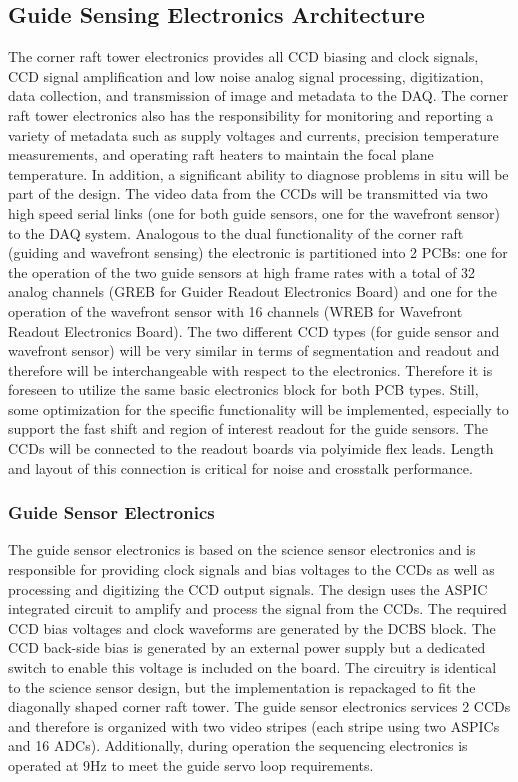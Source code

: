 \subsection{Guide Sensing Electronics Architecture}

The corner raft tower electronics provides all CCD biasing and clock signals, CCD signal amplification and
low noise analog signal processing, digitization, data collection, and transmission of image and metadata
to the DAQ. The corner raft tower electronics also has the responsibility for monitoring and reporting a
variety of metadata such as supply voltages and currents, precision temperature measurements, and
operating raft heaters to maintain the focal plane temperature. In addition, a significant ability to
diagnose problems in situ will be part of the design. The video data from the CCDs will be transmitted
via two high speed serial links (one for both guide sensors, one for the wavefront sensor) to the DAQ
system. Analogous to the dual functionality of the corner raft (guiding and wavefront sensing) the
electronic is partitioned into 2 PCBs: one for the operation of the two guide sensors at high frame rates
with a total of 32 analog channels (GREB for Guider Readout Electronics Board) and one for the
operation of the wavefront sensor with 16 channels (WREB for Wavefront Readout Electronics Board).
The two different CCD types (for guide sensor and wavefront sensor) will be very similar in terms of
segmentation and readout and therefore will be interchangeable with respect to the electronics.
Therefore it is foreseen to utilize the same basic electronics block for both PCB types. Still, some
optimization for the specific functionality will be implemented, especially to support the fast shift and
region of interest readout for the guide sensors. The CCDs will be connected to the readout boards via
polyimide flex leads. Length and layout of this connection is critical for noise and crosstalk performance.

\subsubsection{Guide Sensor Electronics}
The guide sensor electronics is based on the science sensor electronics and is responsible for providing
clock signals and bias voltages to the CCDs as well as processing and digitizing the CCD output signals.
The design uses the ASPIC integrated circuit to amplify and process the signal from the CCDs. The
required CCD bias voltages and clock waveforms are generated by the DCBS block. The CCD back-side
bias is generated by an external power supply but a dedicated switch to enable this voltage is included
on the board. The circuitry is identical to the science sensor design, but the implementation is repackaged
to fit the diagonally shaped corner raft tower. The guide sensor electronics services 2 CCDs
and therefore is organized with two video stripes (each stripe using two ASPICs and 16 ADCs).
Additionally, during operation the sequencing electronics is operated at 9Hz to meet the guide servo
loop requirements.

